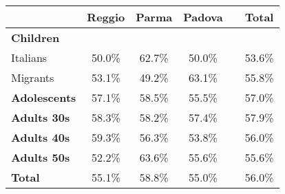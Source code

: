 \begin{tabular}{lccccc}
\toprule
 & \textbf{Reggio} & \textbf{Parma} & \textbf{Padova} &  & \textbf{Total} \\
\midrule
\textbf{Children} & & & &  &  \\
\quad Italians & 50.0\% & 62.7\% & 50.0\% &  & 53.6\% \\
\quad Migrants & 53.1\% & 49.2\% & 63.1\% &  & 55.8\% \\
\textbf{Adolescents} & 57.1\% & 58.5\% & 55.5\% &  & 57.0\% \\
\textbf{Adults 30s} & 58.3\% & 58.2\% & 57.4\% &  & 57.9\% \\
\textbf{Adults 40s} & 59.3\% & 56.3\% & 53.8\% &  & 56.0\%\\
\textbf{Adults 50s} & 52.2\% & 63.6\% & 55.6\% &  & 55.6\%\\
\midrule 
\textbf{Total} & 55.1\% & 58.8\% & 55.0\% &  & 56.0\% \\
\bottomrule
\end{tabular}

